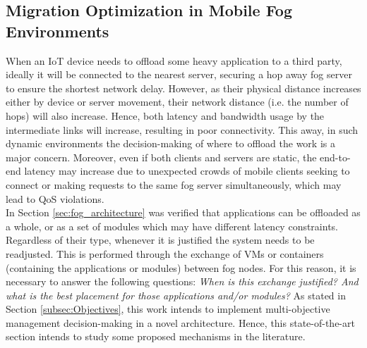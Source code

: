 \subsection{Migration Optimization in Mobile Fog Environments}
\label{sec:Migration}
\noindent When an IoT device needs to offload some heavy application to a third party, ideally it will be connected to the nearest server, securing a hop away fog server to ensure the shortest network delay. However, as their physical distance increases either by device or server movement, their network distance (i.e. the number of hops) will also increase. Hence, both latency and bandwidth usage by the intermediate links will increase, resulting in poor connectivity. This away, in such dynamic environments the decision-making of where to offload the work is a major concern. Moreover, even if both clients and servers are static, the end-to-end latency may increase due to unexpected crowds of mobile clients seeking to connect or making requests to the same fog server simultaneously, which may lead to QoS violations.\\
\noindent\tab In Section \ref{sec:fog_architecture} was verified that applications can be offloaded as a whole, or as a set of modules which may have different latency constraints. Regardless of their type, whenever it is justified the system needs to be readjusted. This is performed through the exchange of VMs or containers (containing the applications or modules) between fog nodes. For this reason, it is necessary to answer the following questions: \textit{When is this exchange justified? And what is the best placement for those applications and/or modules?} As stated in Section \ref{subsec:Objectives}, this work intends to implement multi-objective management decision-making in a novel architecture. Hence, this state-of-the-art section intends to study some proposed mechanisms in the literature.

